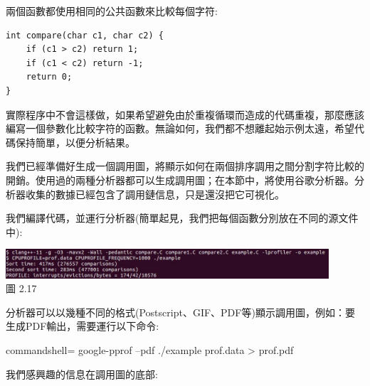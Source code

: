 兩個函數都使用相同的公共函數來比較每個字符:

\begin{lstlisting}[style=styleCXX]
int compare(char c1, char c2) {
	if (c1 > c2) return 1;
	if (c1 < c2) return -1;
	return 0;
}
\end{lstlisting}

實際程序中不會這樣做，如果希望避免由於重複循環而造成的代碼重複，那麼應該編寫一個參數化比較字符的函數。無論如何，我們都不想離起始示例太遠，希望代碼保持簡單，以便分析結果。

我們已經準備好生成一個調用圖，將顯示如何在兩個排序調用之間分割字符比較的開銷。使用過的兩種分析器都可以生成調用圖；在本節中，將使用谷歌分析器。分析器收集的數據已經包含了調用鏈信息，只是還沒把它可視化。

我們編譯代碼，並運行分析器(簡單起見，我們把每個函數分別放在不同的源文件中):

\begin{center}
\includegraphics[width=0.9\textwidth]{content/1/chapter2/images/17.jpg}\\
圖 2.17
\end{center}

分析器可以以幾種不同的格式(Postscript、GIF、PDF等)顯示調用圖，例如：要生成PDF輸出，需要運行以下命令:

\begin{tcblisting}{commandshell={}}
google-pprof --pdf ./example prof.data > prof.pdf
\end{tcblisting}

我們感興趣的信息在調用圖的底部:

